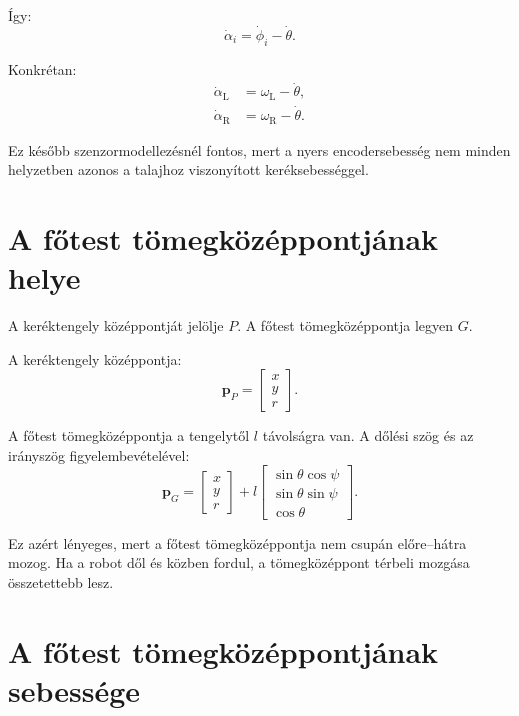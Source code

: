 \documentclass[12pt,a4paper]{article}
\newcommand{\omegaL}{\omega_{\mathrm{L}}}
\newcommand{\omegaR}{\omega_{\mathrm{R}}}
\newcommand{\alphL}{\alpha_{\mathrm{L}}}
\newcommand{\alphR}{\alpha_{\mathrm{R}}}
\begin{document}
	Így:
	\begin{equation}
		\dot\alpha_i=\dot\phi_i-\dot\theta.
	\end{equation}
	
	Konkrétan:
	\begin{align}
		\dot\alphL &= \omegaL-\dot\theta,\\
		\dot\alphR &= \omegaR-\dot\theta.
	\end{align}
	
	Ez később szenzormodellezésnél fontos, mert a nyers encodersebesség nem minden helyzetben azonos a talajhoz viszonyított keréksebességgel.
	
	\section{A főtest tömegközéppontjának helye}
	
	A keréktengely középpontját jelölje $P$. A főtest tömegközéppontja legyen $G$.
	
	A keréktengely középpontja:
	\begin{equation}
		\bm p_P=
		\begin{bmatrix}
			x\\y\\r
		\end{bmatrix}.
	\end{equation}
	
	A főtest tömegközéppontja a tengelytől $l$ távolságra van. A dőlési szög és az irányszög figyelembevételével:
	\begin{equation}
		\bm p_G=
		\begin{bmatrix}
			x\\y\\r
		\end{bmatrix}
		+l
		\begin{bmatrix}
			\sin\theta\cos\psi\\
			\sin\theta\sin\psi\\
			\cos\theta
		\end{bmatrix}.
	\end{equation}
	
	Ez azért lényeges, mert a főtest tömegközéppontja nem csupán előre--hátra mozog. Ha a robot dől és közben fordul, a tömegközéppont térbeli mozgása összetettebb lesz.
	
	\section{A főtest tömegközéppontjának sebessége}
	
\end{document}
